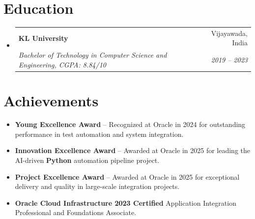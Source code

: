 \documentclass[letterpaper,11pt]{article}
\makeatletter
\newcommand{\resumeItem}[1]{
  \item\small{
    {#1 \vspace{-2pt}}
  }
}
\newcommand{\resumeSubheading}[4]{
  \vspace{-2pt}\item
    \begin{tabular*}{0.97\textwidth}[t]{l@{\extracolsep{\fill}}r}
      \textbf{#1} & #2 \\
      \textit{\small#3} & \textit{\small #4} \\
    \end{tabular*}\vspace{-7pt}
}
\newcommand{\resumeSubHeadingListStart}{\begin{itemize}[leftmargin=0.15in, label={}]}
\newcommand{\resumeSubHeadingListEnd}{\end{itemize}}
\newcommand{\resumeItemListStart}{\begin{itemize}}
\newcommand{\resumeItemListEnd}{\end{itemize}\vspace{-5pt}}
\makeatother
\begin{document}
\section{Education}
\resumeSubHeadingListStart
    \resumeSubheading
        {KL University}{Vijayawada, India}
        {Bachelor of Technology in Computer Science and Engineering, CGPA: 8.84/10}{2019 -- 2023}
\resumeSubHeadingListEnd

\section{Achievements}
\resumeItemListStart
    \resumeItem{\textbf{Young Excellence Award} -- Recognized at Oracle in 2024 for outstanding performance in test automation and system integration.}
    \resumeItem{\textbf{Innovation Excellence Award} -- Awarded at Oracle in 2025 for leading the AI-driven \textbf{Python} automation pipeline project.}
    \resumeItem{\textbf{Project Excellence Award} -- Awarded at Oracle in 2025 for exceptional delivery and quality in large-scale integration projects.}
    \resumeItem{\textbf{Oracle Cloud Infrastructure 2023 Certified} Application Integration Professional and Foundations Associate.}
\resumeItemListEnd
\end{document}
